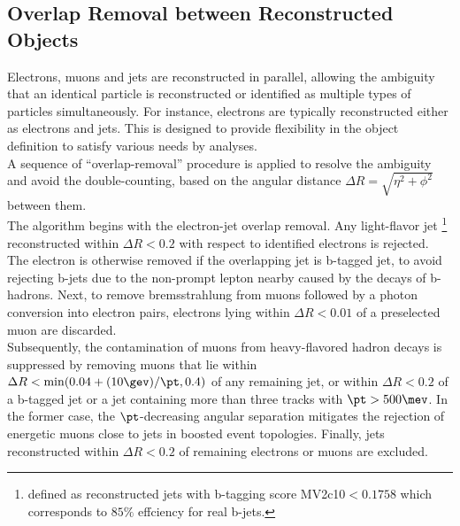 





\subsection{Overlap Removal between Reconstructed Objects} \label{sec::objDef::OR}
Electrons, muons and jets are reconstructed in parallel, allowing the ambiguity that an identical particle is reconstructed or identified as multiple types of particles simultaneously. 
For instance, electrons are typically reconstructed either as electrons and jets. 
This is designed to provide flexibility in the object definition to satisfy various needs by analyses.  \\

A sequence of ``overlap-removal'' procedure is applied to resolve the ambiguity and avoid the double-counting, based on the angular distance $\Delta R = \sqrt{\eta^2+\phi^2}$ between them.  \\

The algorithm begins with the electron-jet overlap removal.
Any light-flavor jet \footnote{defined as reconstructed jets with b-tagging score MV2c10$<0.1758$ which corresponds to $85\%$ effciency for real b-jets.} 
reconstructed within $\Delta R < 0.2$ with respect to identified electrons is rejected.
The electron is otherwise removed if the overlapping jet is b-tagged jet, 
to avoid rejecting b-jets due to the non-prompt lepton nearby caused by the decays of b-hadrons. Next, to remove bremsstrahlung from muons followed by a photon conversion into electron pairs, electrons lying within $\Delta R < 0.01$ of a preselected muon are discarded.  \\

Subsequently, the contamination of muons from heavy-flavored hadron decays is suppressed by removing muons that lie within $\Delta R < \min(0.04 + (10 \gev)/\pt, 0.4)$ of any remaining jet, or within $\Delta R < 0.2$ of a b-tagged jet or a jet containing more than three tracks with $\pt > 500 \mev$.
In the former case, the $\pt$-decreasing angular separation mitigates the rejection of energetic muons close to jets in boosted event topologies. Finally, jets reconstructed within $\Delta R < 0.2$ of remaining electrons or muons are excluded. \\

